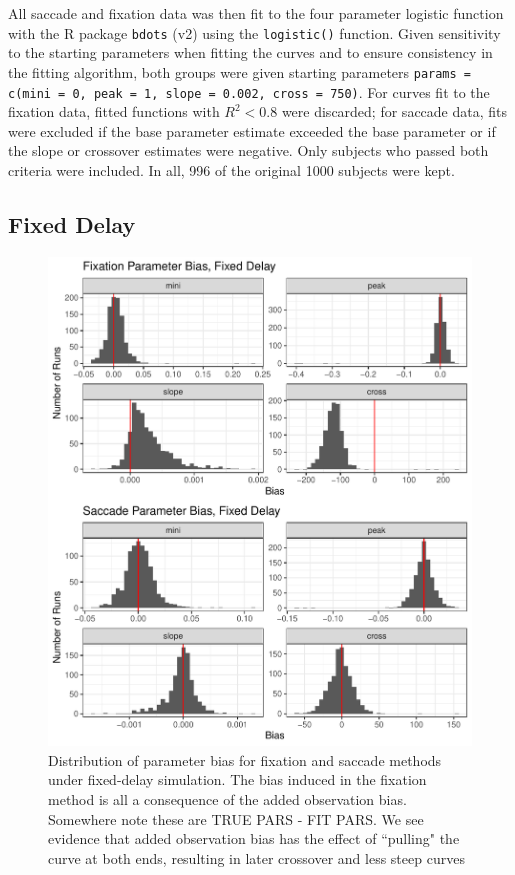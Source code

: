 \documentclass{article}
\newcommand{\xt}{\texttt}%
\begin{document}
All saccade and fixation data was then fit to the four parameter logistic function with the R package \xt{bdots} (v2) using the \xt{logistic()} function. Given sensitivity to the starting parameters when fitting the curves and to ensure consistency in the fitting algorithm, both groups were given starting parameters \xt{params = c(mini = 0, peak = 1, slope = 0.002,  cross = 750)}. For curves fit to the fixation data, fitted functions with $R^2 < 0.8$ were discarded; for saccade data, fits were excluded if the base parameter estimate exceeded the base parameter or if the slope or crossover estimates were negative. Only subjects who passed both criteria were included. In all, 996 of the original 1000 subjects were kept.


\subsection{Fixed Delay}

\begin{figure}[H]
\centering
\includegraphics{fixed_delay_par_bias.pdf}
\caption{Distribution of parameter bias for fixation and saccade methods under fixed-delay simulation. The bias induced in the fixation method is all a consequence of the added observation bias. Somewhere note these are TRUE PARS - FIT PARS. We see evidence that added observation bias has the effect of ``pulling" the curve at both ends, resulting in later crossover and less steep curves}
\label{fig:fixed_par_bias}
\end{figure}
\end{document}
